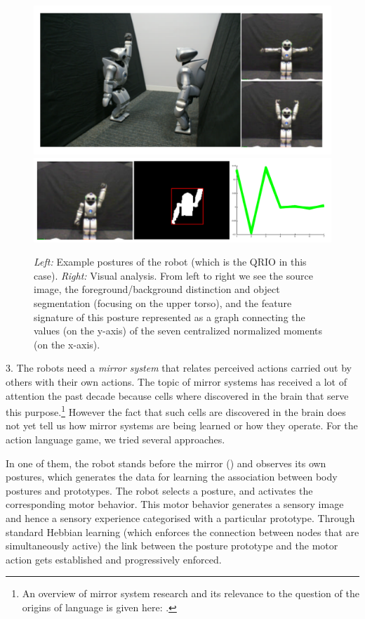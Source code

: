 \begin{figure}
\centerline{\includegraphics[width=0.2\linewidth]{chap11/figs/postures.pdf}\includegraphics[width=0.75\linewidth]{chap11/figs/vision_2.pdf}}
\caption{\label{vision} \footnotesize{{\itshape Left:} Example postures of the robot (which is the QRIO in this case).
{\itshape Right:} Visual analysis. From left to right we see the source image, the foreground/background distinction and object segmentation (focusing on the upper torso), and the feature signature of this posture represented as a graph connecting the values (on the y-axis)
of the seven centralized normalized moments (on the x-axis).}}
\end{figure}

3. The robots need a {\itshape mirror system} that relates perceived actions carried out by others with their own actions. 
The topic of mirror systems has received a lot of attention the past decade because cells where discovered in the brain 
that serve this purpose.\footnote{
An overview of mirror system research and its relevance to the question of the origins of language is given here: 
\cite{Rizzolatti:1998}.}
However the fact that such cells are discovered in the brain 
does not yet tell us how mirror systems are being learned or how they operate. For the action language game, we tried 
several approaches.

In one of them, the robot stands before the mirror () and observes its own 
postures, which generates the data for learning the association between body postures and prototypes. 
The robot selects a posture, and activates the corresponding motor behavior. This motor behavior generates a sensory image and 
hence a sensory experience categorised with a particular prototype. Through standard Hebbian learning (which enforces the 
connection between nodes that are simultaneously active) the link between the posture prototype and the motor action gets 
established and progressively enforced. 


